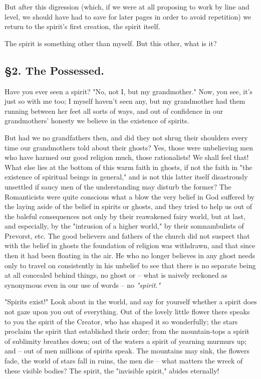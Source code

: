 But after this digression (which, if we were at all proposing to work by line 
and level, we should have had to save for later pages in order to avoid 
repetition) we return to the spirit's first creation, the spirit itself.

The spirit is something other than myself. But this other, what is it?

\medskip{}

\subsection[\S{}2. The Possessed]{\centering \S{}2. The Possessed.}

Have you ever seen a spirit? "{}No, not I, but my grandmother."{} Now, you 
see, it's just so with me too; I myself haven't seen any, but my grandmother 
had them running between her feet all sorts of ways, and out of confidence in 
our grandmothers' honesty we believe in the existence of spirits.

But had we no grandfathers then, and did they not shrug their shoulders every 
time our grandmothers told about their ghosts? Yes, those were unbelieving men 
who have harmed our good religion much, those rationalists! We shall feel 
that! What else lies at the bottom of this warm faith in ghosts, if not the 
faith in "{}the existence of spiritual beings in general,"{} and is not this 
latter itself disastrously unsettled if saucy men of the understanding may 
disturb the former? The Romanticists were quite conscious what a blow the very 
belief in God suffered by the laying aside of the belief in spirits or ghosts, 
and they tried to help us out of the baleful consequences not only by their 
reawakened fairy world, but at last, and especially, by the "{}intrusion of a 
higher world,"{} by their somnambulists of Prevorst, etc. The good believers 
and fathers of the church did not suspect that with the belief in ghosts the 
foundation of religion was withdrawn, and that since then it had been floating 
in the air. He who no longer believes in any ghost needs only to travel on 
consistently in his unbelief to see that there is no separate being at all 
concealed behind things, no ghost or -- what is naively reckoned as synonymous 
even in our use of words -- no \textit{"{}spirit."{}}

"{}Spirits exist!"{} Look about in the world, and say for yourself whether a 
spirit does not gaze upon you out of everything. Out of the lovely little 
flower there speaks to you the spirit of the Creator, who has shaped it so 
wonderfully; the stars proclaim the spirit that established their order; from 
the mountain-tops a spirit of sublimity breathes down; out of the waters a 
spirit of yearning murmurs up; and -- out of men millions of spirits speak. 
The mountains may sink, the flowers fade, the world of stars fall in ruins, 
the men die -- what matters the wreck of these visible bodies? The spirit, the 
"{}invisible spirit,"{} abides eternally!

